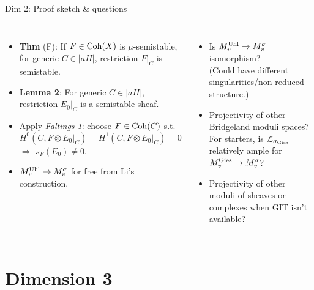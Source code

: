 \documentclass[8pt]{beamer} %
\begin{document}
\begin{frame}[fragile]{Dim 2: Proof sketch \& questions}
\begin{columns}[t]
        \begin{itemize}
            \item<6-> \textbf{Thm} (F): If $F \in \mathrm{Coh}(X)$ is $\mu$-semistable, for generic $C \in |a H|$, restriction $F|_C$ is semistable.
            \item<7-> \textbf{Lemma 2}: For generic $C \in |a H|$, restriction $E_0|_C$ is a semistable sheaf.
            \item<8-> Apply \textit{Faltings 1}: choose $F \in \mathrm{Coh}(C)$ s.t. 
            \[ H^0(C, F \otimes E_0|_C) = H^1(C, F \otimes E_0|_C) = 0 \]
            $\Rightarrow$ $s_F(E_0) \neq 0$.
            \item<9-> $M^{\text{Uhl}}_v \to M^\sigma_v$ for free from Li's construction.
        \end{itemize}
        \begin{itemize}
            \item<11-> Is $M^{\text{Uhl}}_v \to M^\sigma_v$ isomorphism? \\ {\footnotesize (Could have different singularities/non-reduced structure.)}
            \item<12-> Projectivity of other Bridgeland moduli spaces? For starters, is $\mathcal{L}_{\sigma_\text{Gies}}$ relatively ample for $M^{\text{Gies}}_v \to M^\sigma_v$?
            \item<13-> Projectivity of other moduli of sheaves or complexes when GIT isn't available?
        \end{itemize}
    \end{columns}
\end{frame}

\section{Dimension 3}
\end{document}

